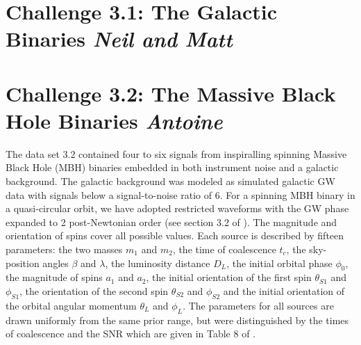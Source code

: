 \documentclass{iopart}
\begin{document}

\section{Challenge 3.1: The Galactic Binaries {\it Neil and Matt}}

\section{Challenge 3.2: The Massive Black Hole Binaries {\it Antoine}}
The data set 3.2 contained four to six signals from inspiralling spinning Massive Black Hole (MBH) binaries embedded in both instrument noise and a galactic background. The galactic background was modeled as simulated 
galactic GW data with signals below  a signal-to-noise ratio  of 6. 
For a spinning MBH binary in a quasi-circular orbit, we have adopted restricted waveforms with 
the GW phase expanded to 2 post-Newtonian order (see section 3.2 of \cite{MLDC3}). The magnitude and orientation of spins cover all possible values.  Each source is described by fifteen parameters: the two masses $m_{1}$ and $m_{2}$, the time of coalescence $t_{c}$, the sky-position angles $\beta$ and $\lambda$, the luminosity distance $D_{L}$, the initial orbital phase $\phi_{0}$, the magnitude of spins $a_{1}$ and $a_{2}$, the initial orientation of the first spin  $\theta_{S1}$ and $\phi_{S1}$, the orientation of the second spin $\theta_{S2}$ and $\phi_{S2}$ and the initial orientation of the orbital angular momentum  $\theta_{L}$ and $\phi_{L}$. The parameters for all sources are drawn uniformly from the 
same prior range, but were distinguished by the times of coalescence and the SNR which are given in Table 8 of \cite{MLDC3}.
\end{document}
